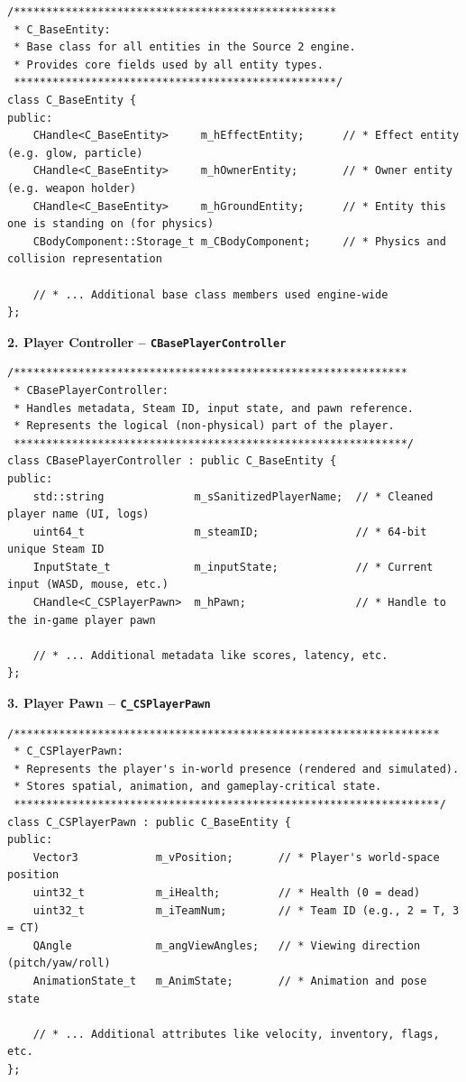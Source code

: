 \begin{lstlisting}[style=cppstyle, caption={C\_BaseEntity – Core Class for All Entities}]
/**************************************************
 * C_BaseEntity:
 * Base class for all entities in the Source 2 engine.
 * Provides core fields used by all entity types.
 **************************************************/
class C_BaseEntity {
public:
    CHandle<C_BaseEntity>     m_hEffectEntity;      // * Effect entity (e.g. glow, particle)
    CHandle<C_BaseEntity>     m_hOwnerEntity;       // * Owner entity (e.g. weapon holder)
    CHandle<C_BaseEntity>     m_hGroundEntity;      // * Entity this one is standing on (for physics)
    CBodyComponent::Storage_t m_CBodyComponent;     // * Physics and collision representation

    // * ... Additional base class members used engine-wide
};
\end{lstlisting}


\vspace{1em}
\noindent\textbf{2. Player Controller – \texttt{CBasePlayerController}}

\begin{lstlisting}[style=cppstyle, caption={CBasePlayerController – Player Metadata and Input Handler}]
/*************************************************************
 * CBasePlayerController:
 * Handles metadata, Steam ID, input state, and pawn reference.
 * Represents the logical (non-physical) part of the player.
 *************************************************************/
class CBasePlayerController : public C_BaseEntity {
public:
    std::string              m_sSanitizedPlayerName;  // * Cleaned player name (UI, logs)
    uint64_t                 m_steamID;               // * 64-bit unique Steam ID
    InputState_t             m_inputState;            // * Current input (WASD, mouse, etc.)
    CHandle<C_CSPlayerPawn>  m_hPawn;                 // * Handle to the in-game player pawn

    // * ... Additional metadata like scores, latency, etc.
};
\end{lstlisting}

\vspace{1em}
\noindent\textbf{3. Player Pawn – \texttt{C\_CSPlayerPawn}}

\begin{lstlisting}[style=cppstyle, caption={C\_CSPlayerPawn – In-World Representation of the Player}]
/******************************************************************
 * C_CSPlayerPawn:
 * Represents the player's in-world presence (rendered and simulated).
 * Stores spatial, animation, and gameplay-critical state.
 ******************************************************************/
class C_CSPlayerPawn : public C_BaseEntity {
public:
    Vector3            m_vPosition;       // * Player's world-space position
    uint32_t           m_iHealth;         // * Health (0 = dead)
    uint32_t           m_iTeamNum;        // * Team ID (e.g., 2 = T, 3 = CT)
    QAngle             m_angViewAngles;   // * Viewing direction (pitch/yaw/roll)
    AnimationState_t   m_AnimState;       // * Animation and pose state

    // * ... Additional attributes like velocity, inventory, flags, etc.
};
\end{lstlisting}

